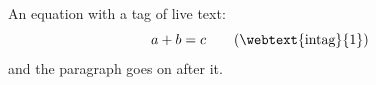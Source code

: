 An equation with a tag of live text:
\begin{equation}
  a + b = c \tag{\webtext{intag}{1}}
\end{equation}
and the paragraph goes on after it.
